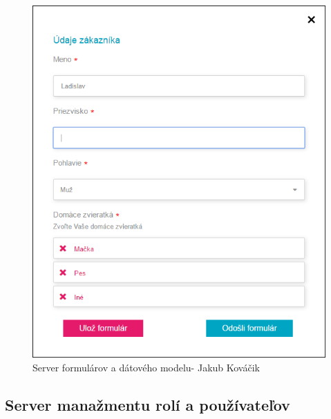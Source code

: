 \begin{figure}[H]
	\centering
	\includegraphics[width=0.4\linewidth]{images/kubko}
	\caption{Server formulárov a dátového modelu- Jakub Kováčik}
	\label{fig:Server formulárov a dátového modelu- Jakub Kováčik}
\end{figure}



\subsection{Server manažmentu rolí a používateľov}

	


	

